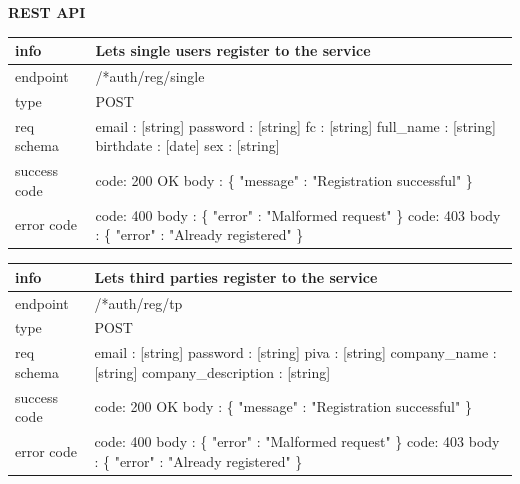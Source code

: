 \documentclass[titlepage]{article}
\begin{document}
\pagebreak

{\bf REST API}

\begin{tabularx}{\textwidth}{lX} \hline
    info & Lets single users register to the service \\ \hline
    endpoint & /*auth/reg/single \\ \hline
    type & POST \\ \hline
    req schema & 
        email : [string] \newline
        password : [string] \newline
        fc : [string] \newline
        full\_name : [string] \newline
        birthdate : [date] \newline
        sex : [string] \\ \hline
    success code &
        code: 200 OK \newline 
        body : \{ \newline
        "message" : "Registration successful" \newline
        \} \\ \hline
    error code &
        code: 400 \newline
        body : \{ "error" : "Malformed request" \} \newline \newline
        code: 403 \newline
        body : \{ "error" : "Already registered" \}
\end{tabularx}

\vspace{\baselineskip}

\begin{tabularx}{\textwidth}{lX} \hline
    info & Lets third parties register to the service \\ \hline
    endpoint & /*auth/reg/tp \\ \hline
    type & POST \\ \hline
    req schema & 
        email : [string] \newline
        password : [string] \newline
        piva : [string] \newline
        company\_name : [string] \newline
        company\_description : [string] \\ \hline
    success code &
        code: 200 OK \newline \newline 
        body : \{ \newline
        "message" : "Registration successful" \newline
        \} \\ \hline
    error code &
        code: 400 \newline
        body : \{ "error" : "Malformed request" \} \newline \newline
        code: 403 \newline
        body : \{ "error" : "Already registered" \}
\end{tabularx}
		
\end{document}
